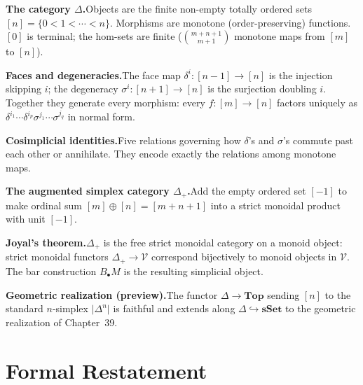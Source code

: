 \begin{summarybox}
\textbf{The category $\Delta$.}\quad Objects are the finite non-empty
totally ordered sets $[n] = \{0 < 1 < \cdots < n\}$. Morphisms are
monotone (order-preserving) functions. $[0]$ is terminal; the hom-sets
are finite ($\binom{m+n+1}{m+1}$ monotone maps from $[m]$ to $[n]$).

\textbf{Faces and degeneracies.}\quad The face map $\delta^i : [n-1]
\to [n]$ is the injection skipping $i$; the degeneracy $\sigma^i :
[n+1] \to [n]$ is the surjection doubling $i$. Together they generate
every morphism: every $f : [m] \to [n]$ factors uniquely as $\delta^{i_1}
\cdots \delta^{i_p} \sigma^{j_1} \cdots \sigma^{j_q}$ in normal form.

\textbf{Cosimplicial identities.}\quad Five relations governing how
$\delta$'s and $\sigma$'s commute past each other or annihilate. They
encode exactly the relations among monotone maps.

\textbf{The augmented simplex category $\Delta_+$.}\quad Add the empty
ordered set $[-1]$ to make ordinal sum $[m] \oplus [n] = [m + n + 1]$
into a strict monoidal product with unit $[-1]$.

\textbf{Joyal's theorem.}\quad $\Delta_+$ is the free strict monoidal
category on a monoid object: strict monoidal functors $\Delta_+ \to
\mathcal{V}$ correspond bijectively to monoid objects in $\mathcal{V}$.
The bar construction $B_\bullet M$ is the resulting simplicial object.

\textbf{Geometric realization (preview).}\quad The functor $\Delta \to
\mathbf{Top}$ sending $[n]$ to the standard $n$-simplex
$\lvert\Delta^n\rvert$ is faithful and extends along $\Delta \hookrightarrow
\mathbf{sSet}$ to the geometric realization of Chapter~39.
\end{summarybox}


\section*{Formal Restatement}

